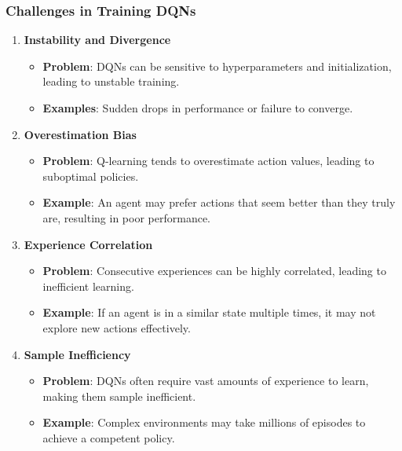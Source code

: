 \documentclass[aspectratio=169]{beamer}
\begin{document}
\begin{frame}[fragile]
  \frametitle{Challenges in Training DQNs}
  \begin{enumerate}
    \item \textbf{Instability and Divergence}
      \begin{itemize}
        \item \textbf{Problem}: DQNs can be sensitive to hyperparameters and initialization, leading to unstable training.
        \item \textbf{Examples}: Sudden drops in performance or failure to converge.
      \end{itemize}

    \item \textbf{Overestimation Bias}
      \begin{itemize}
        \item \textbf{Problem}: Q-learning tends to overestimate action values, leading to suboptimal policies.
        \item \textbf{Example}: An agent may prefer actions that seem better than they truly are, resulting in poor performance.
      \end{itemize}

    \item \textbf{Experience Correlation}
      \begin{itemize}
        \item \textbf{Problem}: Consecutive experiences can be highly correlated, leading to inefficient learning.
        \item \textbf{Example}: If an agent is in a similar state multiple times, it may not explore new actions effectively.
      \end{itemize}

    \item \textbf{Sample Inefficiency}
      \begin{itemize}
        \item \textbf{Problem}: DQNs often require vast amounts of experience to learn, making them sample inefficient.
        \item \textbf{Example}: Complex environments may take millions of episodes to achieve a competent policy.
      \end{itemize}
  \end{enumerate}
\end{frame}
\end{document}
